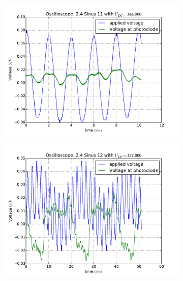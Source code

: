 \begin{figure}
    \begin{subfigure}[b]{\picwidth}
        \includegraphics[width=\textwidth]{analysis/figures/24sinus11}
        \caption{}
    \end{subfigure}\qquad
    \begin{subfigure}[b]{\picwidth}
        \includegraphics[width=\textwidth]{analysis/figures/24sinus12}
        \caption{}
    \end{subfigure}
    \begin{subfigure}[b]{\picwidth}

\end{subfigure}
\end{figure}
